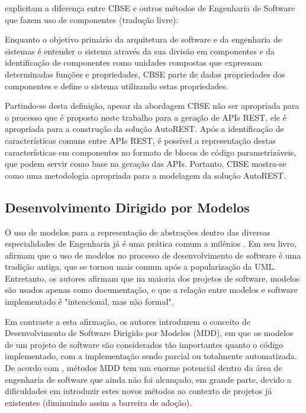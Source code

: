  explicitam a diferença entre CBSE e outros métodos de Engenharia de Software que fazem uso de componentes (tradução livre):

\begin{citacao}
Enquanto o objetivo primário da arquitetura de software e da engenharia de sistemas é entender o sistema através da sua divisão em componentes e da identificação de componentes como unidades compostas que expressam determinadas funções e propriedades, CBSE parte de dadas propriedades dos componentes e define o sistema utilizando estas propriedades.
\end{citacao}

Partindo-se desta definição, apesar da abordagem CBSE não ser apropriada para o processo que é proposto neste trabalho para a geração de APIs REST, ele é apropriada para a construção da solução AutoREST. Após a identificação de características comuns entre APIs REST, é possível a representação destas características em componentes no formato de blocos de código parametrizáveis, que podem servir como base na geração das APIs. Portanto, CBSE mostra-se como uma metodologia apropriada para a modelagem da solução AutoREST.


\subsection{Desenvolvimento Dirigido por Modelos}

O uso de modelos para a representação de abstrações dentro das diversas especialidades de Engenharia já é uma prática comum a milênios \cite{VITRUVIUS:1914}. Em seu livro,  afirmam que o uso de modelos no processo de desenvolvimento de software é uma tradição antiga, que se tornou mais comum após a popularização da UML. Entretanto, os autores afirmam que na maioria dos projetos de software, modelos são usados apenas como documentação, e que a relação entre modelos e software implementado é "intencional, mas não formal".

Em contraste a esta afirmação, os autores introduzem o conceito de Desenvolvimento de Software Dirigido por Modelos (MDD), em que os modelos de um projeto de software são considerados tão importantes quanto o código implementado, com a implementação sendo parcial ou totalmente automatizada. De acordo com , métodos MDD tem um enorme potencial dentro da área de engenharia de software que ainda não foi alcançado, em grande parte, devido a dificuldades em introduzir estes novos métodos ao contexto de projetos já existentes (diminuindo assim a barreira de adoção).

